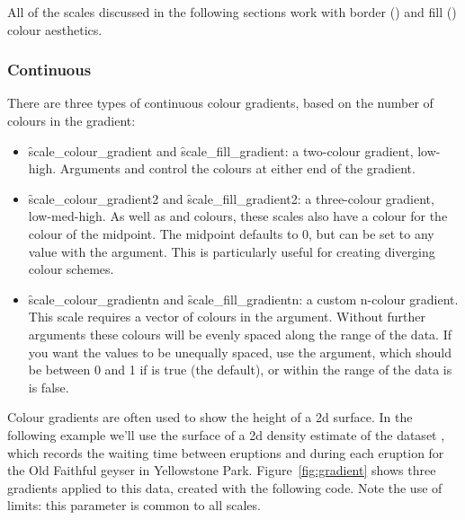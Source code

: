 All of the scales discussed in the following sections work with border () and fill () colour aesthetics.


\subsubsection{Continuous}
\label{ssub:colour-continuous}

There are three types of continuous colour gradients, based on the number of colours in the gradient: 

\begin{itemize}
  \item \f{scale_colour_gradient} and \f{scale_fill_gradient}: a two-colour gradient, low-high.  Arguments  and  control the colours at either end of the gradient.

  \item \f{scale_colour_gradient2} and \f{scale_fill_gradient2}: a three-colour gradient, low-med-high.  As well as  and  colours, these scales also have a  colour for the colour of the midpoint.  The midpoint defaults to 0, but can be set to any value with the  argument.  This is particularly useful for creating diverging colour schemes.

  \item \f{scale_colour_gradientn} and \f{scale_fill_gradientn}: a custom n-colour gradient.  This scale requires a vector of colours in the  argument.  Without further arguments these colours will be evenly spaced along the range of the data.  If you want the values to be unequally spaced, use the  argument, which should be between 0 and 1 if  is true (the default), or within the range of the data is  is false.
\end{itemize}

Colour gradients are often used to show the height of a 2d surface.  In the following example we'll use the surface of a 2d density estimate of the  dataset \citep{azzalini:1990}, which records the waiting time between eruptions and during each eruption for the Old Faithful geyser in Yellowstone Park. Figure~\ref{fig:gradient} shows three gradients applied to this data, created with the following code.  Note the use of limits: this parameter is common to all scales.

